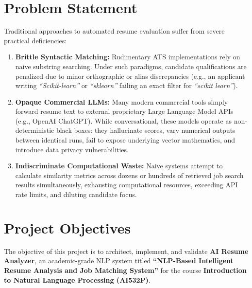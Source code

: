 \documentclass[12pt,a4paper]{report}
\begin{document}
\section{Problem Statement}
Traditional approaches to automated resume evaluation suffer from severe practical deficiencies:
\begin{enumerate}
    \item \textbf{Brittle Syntactic Matching:} Rudimentary ATS implementations rely on naive substring searching. Under such paradigms, candidate qualifications are penalized due to minor orthographic or alias discrepancies (e.g., an applicant writing \textit{“Scikit-learn”} or \textit{“sklearn”} failing an exact filter for \textit{“scikit learn”}).
    \item \textbf{Opaque Commercial LLMs:} Many modern commercial tools simply forward resume text to external proprietary Large Language Model APIs (e.g., OpenAI ChatGPT). While conversational, these models operate as non-deterministic black boxes: they hallucinate scores, vary numerical outputs between identical runs, fail to expose underlying vector mathematics, and introduce data privacy vulnerabilities.
    \item \textbf{Indiscriminate Computational Waste:} Naive systems attempt to calculate similarity metrics across dozens or hundreds of retrieved job search results simultaneously, exhausting computational resources, exceeding API rate limits, and diluting candidate focus.
\end{enumerate}

\section{Project Objectives}
The objective of this project is to architect, implement, and validate \textbf{AI Resume Analyzer}, an academic-grade NLP system titled \textbf{“NLP-Based Intelligent Resume Analysis and Job Matching System”} for the course \textbf{Introduction to Natural Language Processing (AI532P)}.
\end{document}
